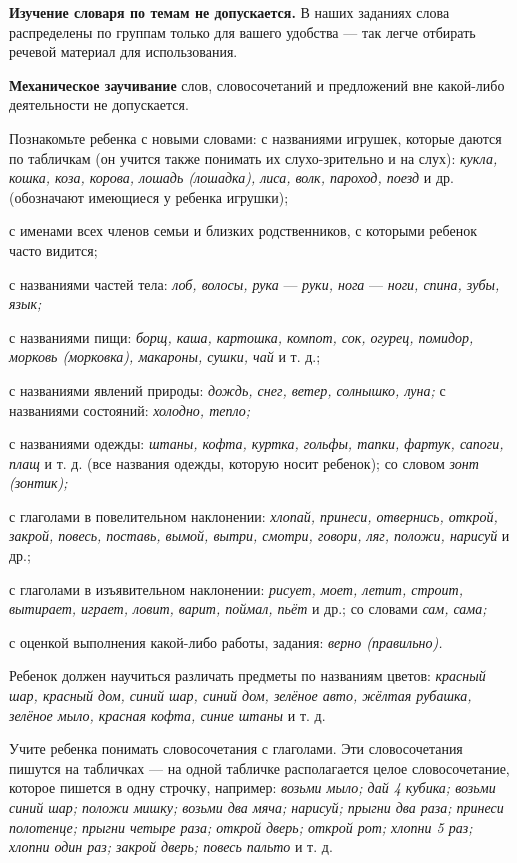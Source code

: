 \documentclass{book}
\renewcommand{\emph}[1]{\textit{#1}}
\begin{document}
\textbf{Изучение словаря по темам не допускается.} В наших заданиях
слова распределены по группам только для вашего удобства --- так легче
отбирать речевой материал для использования.

\textbf{Механическое заучивание} слов, словосочетаний и предложений вне
какой-либо деятельности не допускается.

Познакомьте ребенка с новыми словами: с названиями игрушек, которые
даются по табличкам (он учится также понимать их слухо-зрительно и на
слух): \emph{кукла, кошка, коза, корова, лошадь (лошадка), лиса, волк,
пароход, поезд} и др. (обозначают имеющиеся у ребенка игрушки);

с именами всех членов семьи и близких родственников, с которыми ребенок
часто видится;

с названиями частей тела: \emph{лоб, волосы, рука} --- \emph{руки, нога}
--- \emph{ноги, спина, зубы, язык;}

с названиями пищи: \emph{борщ, каша, картошка, компот, сок, огурец,
помидор, морковь (морковка), макароны, сушки, чай} и т. д.;

с названиями явлений природы: \emph{дождь, снег, ветер, солнышко, луна;}
с названиями состояний: \emph{холодно, тепло;}

с названиями одежды: \emph{штаны, кофта, куртка, гольфы, тапки, фартук,
сапоги, плащ} и т. д. (все названия одежды, которую носит ребенок); со
словом \emph{зонт (зонтик);}

с глаголами в повелительном наклонении: \emph{хлопай, принеси,
отвернись, открой, закрой, повесь, поставь, вымой, вытри, смотри,
говори, ляг, положи, нарисуй} и др.;

с глаголами в изъявительном наклонении: \emph{рисует, моет, летит,
строит, вытирает, играет, ловит, варит, поймал, пьёт} и др.; со словами
\emph{сам, сама;}

с оценкой выполнения какой-либо работы, задания: \emph{верно
(правильно).}

Ребенок должен научиться различать предметы по названиям цветов:
\emph{красный шар, красный дом, синий шар, синий дом, зелёное авто,
жёлтая рубашка, зелёное мыло, красная кофта, синие штаны} и т. д.

Учите ребенка понимать словосочетания с глаголами. Эти словосочетания
пишутся на табличках --- на одной табличке располагается целое
словосочетание, которое пишется в одну строчку, например: \emph{возьми
мыло; дай 4 кубика; возьми синий шар; положи мишку; возьми два мяча;
нарисуй; прыгни два раза; принеси полотенце; прыгни четыре раза; открой
дверь; открой рот; хлопни 5 раз; хлопни один раз; закрой дверь; повесь
пальто} и т. д.
\end{document}

